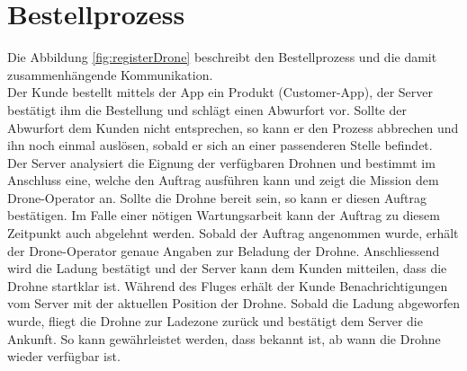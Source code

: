 \section{Bestellprozess}

Die Abbildung \ref{fig:registerDrone} beschreibt den Bestellprozess und die damit zusammenhängende Kommunikation. \\

Der Kunde bestellt mittels der App ein Produkt (Customer-App), der Server bestätigt ihm die Bestellung und schlägt einen Abwurfort vor. Sollte der Abwurfort dem Kunden nicht entsprechen, so kann er den Prozess abbrechen und ihn noch einmal auslösen, sobald er sich an einer passenderen Stelle befindet.\\

Der Server analysiert die Eignung der verfügbaren Drohnen und bestimmt im Anschluss eine, welche den Auftrag ausführen kann und zeigt die Mission dem Drone-Operator an. Sollte die Drohne bereit sein, so kann er diesen Auftrag bestätigen. Im Falle einer nötigen Wartungsarbeit kann der Auftrag zu diesem Zeitpunkt auch abgelehnt werden. Sobald der Auftrag angenommen wurde, erhält der Drone-Operator genaue Angaben zur Beladung der Drohne. Anschliessend wird die Ladung bestätigt und der Server kann dem Kunden mitteilen, dass die Drohne startklar ist. Während des Fluges erhält der Kunde Benachrichtigungen vom Server mit der aktuellen Position der Drohne. Sobald die Ladung abgeworfen wurde, fliegt die Drohne zur Ladezone zurück und bestätigt dem Server die Ankunft. So kann gewährleistet werden, dass bekannt ist, ab wann die Drohne wieder verfügbar ist. \\

